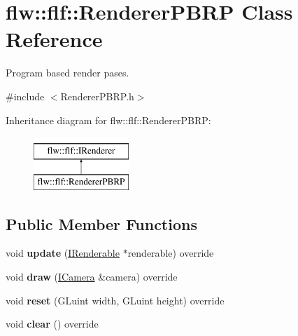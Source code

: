 \hypertarget{classflw_1_1flf_1_1RendererPBRP}{}\section{flw\+:\+:flf\+:\+:Renderer\+P\+B\+RP Class Reference}
\label{classflw_1_1flf_1_1RendererPBRP}


Program based render pases.  




{\ttfamily \#include $<$Renderer\+P\+B\+R\+P.\+h$>$}

Inheritance diagram for flw\+:\+:flf\+:\+:Renderer\+P\+B\+RP\+:\begin{figure}[H]
\begin{center}
\leavevmode
\includegraphics[height=2.000000cm]{classflw_1_1flf_1_1RendererPBRP}
\end{center}
\end{figure}
\subsection*{Public Member Functions}
\begin{DoxyCompactItemize}
\item 
void {\bfseries update} (\hyperlink{classflw_1_1flf_1_1IRenderable}{I\+Renderable} $\ast$renderable) override\hypertarget{classflw_1_1flf_1_1RendererPBRP_a3924b33dd9addf8b0ac6d9087a8e201b}{}\label{classflw_1_1flf_1_1RendererPBRP_a3924b33dd9addf8b0ac6d9087a8e201b}

\item 
void {\bfseries draw} (\hyperlink{classflw_1_1flf_1_1ICamera}{I\+Camera} \&camera) override\hypertarget{classflw_1_1flf_1_1RendererPBRP_af2dab0da144234969d5555703881ef59}{}\label{classflw_1_1flf_1_1RendererPBRP_af2dab0da144234969d5555703881ef59}

\item 
void {\bfseries reset} (G\+Luint width, G\+Luint height) override\hypertarget{classflw_1_1flf_1_1RendererPBRP_aaaf92db4563e63c56ff99ffa64e5ea76}{}\label{classflw_1_1flf_1_1RendererPBRP_aaaf92db4563e63c56ff99ffa64e5ea76}

\item 
void {\bfseries clear} () override\hypertarget{classflw_1_1flf_1_1RendererPBRP_a8c931c099d7d57da4b086e1bab997609}{}\label{classflw_1_1flf_1_1RendererPBRP_a8c931c099d7d57da4b086e1bab997609}

\end{DoxyCompactItemize}
